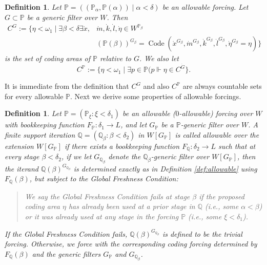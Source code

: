 \documentclass[a4paper,11pt]{article}
\newtheorem{definition}[theorem]{Definition}
\newcommand{\forceP}{\mathbb{P}}
\newcommand{\forceQ}{\mathbb{Q}}
\begin{document}
\begin{definition}
Let $\forceP= ((\forceP_{\alpha}, \forceP({\alpha})) \mid \alpha < \delta)$ be an allowable forcing. Let $G \subset \forceP$ be a generic filter over $W$. Then
\begin{align*}
C^G:= \{ \eta < \omega_1\mid \exists \beta < \delta \exists \dot{x},&\dot{m},\dot{k}, \dot{l}, \dot{\eta} \in W^{\forceP_{\beta}}  \\&( {\forceP}({\beta}))^{G_{\beta}} = \operatorname{Code} (\dot{x}^{G_{\beta}},\dot{m}^{G_{\beta}},\dot{k}^{G_{\beta}},\dot{l}^{G_{\beta}},\dot{\eta}^{G_{\beta}}=\eta )\}
\end{align*}
is the set of coding areas of $\forceP$ relative to $G$. 
We also let 
\[ C^{\forceP} := \{\eta < \omega_1 \mid \exists p \in \forceP ( p \Vdash \eta  \in C^{\dot{G}} \}. \]
\end{definition}
It is immediate from the definition that $C^G$ and also $C^{\forceP}$ are always countable sets for every allowable $\forceP$. Next we derive some properties of allowable forcings.
\begin{definition}\label{def:allowable_extension}
Let $\mathbb{P} = (\mathbb{P}_{\xi} : \xi < \delta_1)$ be an allowable ($0$-allowable) forcing over $W$ with bookkeeping function $F_{\mathbb{P}} : \delta_1 \to L$, and let $G_{\mathbb{P}}$ be a $\mathbb{P}$-generic filter over $W$. A finite support iteration $\mathbb{Q} = (\mathbb{Q}_{\beta} : \beta < \delta_2)$ in $W[G_{\mathbb{P}}]$ is called \emph{allowable over the extension $W[G_{\mathbb{P}}]$} if there exists a bookkeeping function $F_{\mathbb{Q}} : \delta_2 \to L$ such that at every stage $\beta < \delta_2$, if we let $G_{\mathbb{Q}_{\beta}}$ denote the $\forceQ_{\beta}$-generic filter over $W[G_{\forceP}]$, then the iterand $\mathbb{Q}(\beta)^{G_{\mathbb{Q}_\beta}}$ is determined exactly as in Definition \ref{def:allowable} using $F_{\mathbb{Q}}(\beta)$, but subject to the \emph{Global Freshness Condition}: 
\begin{quote}
We say the \emph{Global Freshness Condition} fails at stage $\beta$ if the proposed coding area $\eta$ has already been used at a prior stage in $\mathbb{Q}$ (i.e., some $\alpha < \beta$) or it was already used at any stage in the forcing $\mathbb{P}$ (i.e., some $\xi < \delta_1$).
\end{quote}
If the Global Freshness Condition fails, $\mathbb{Q}(\beta)^{G_{\mathbb{Q}_\beta}}$ is defined to be the trivial forcing. Otherwise, we force with the corresponding coding forcing determined by $F_{\forceQ} (\beta)$ and the generic filters $G_{\forceP}$ and $G_{\forceQ_{\beta}}$.
\end{definition}
\end{document}
